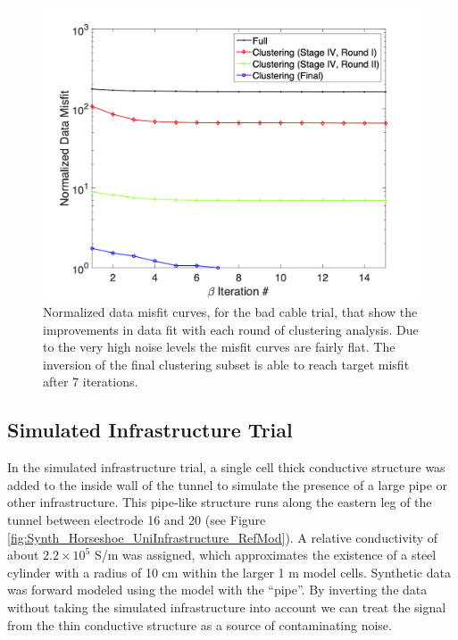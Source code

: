 \documentclass[final,authoryear,5p,times,twocolumn]{elsarticle}
\begin{document}
\begin{figure} [!ht]
	\begin{center}
	\includegraphics[trim=1.3cm 0.2cm 2.6cm 1.2cm, clip=true,width=0.75\linewidth]{./Figures/Fig24.png}
	\end{center}
\caption{Normalized data misfit curves, for the bad cable trial, that show the improvements in data fit with each round of clustering analysis. Due to the very high noise levels the misfit curves are fairly flat. The inversion of the final clustering subset is able to reach target misfit after 7 iterations.}
\label{fig:Synth_Horseshoe_BadCable_MisfitPlots}
\end{figure}

\subsection{Simulated Infrastructure Trial}

In the simulated infrastructure trial, a single cell thick conductive structure was added to the inside wall of the tunnel to simulate the presence of a large pipe or other infrastructure. This pipe-like structure runs along the eastern leg of the tunnel between electrode 16 and 20 (see Figure \ref{fig:Synth_Horseshoe_UniInfrastructure_RefMod}). A relative conductivity of about $2.2 \times 10^5$ S/m was assigned, which approximates the existence of a steel cylinder with a radius of 10 cm within the larger 1 m model cells. Synthetic data was forward modeled using the model with the ``pipe''. By inverting the data without taking the simulated infrastructure into account we can treat the signal from the thin conductive structure as a source of contaminating noise.
\end{document}
